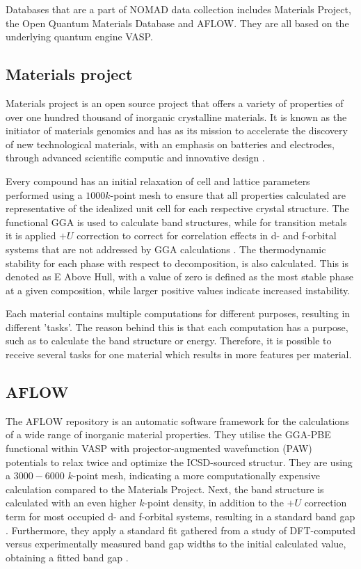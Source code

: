Databases that are a part of NOMAD data collection includes Materials Project, the Open Quantum Materials Database and AFLOW. They are all based on the underlying quantum engine VASP.

\subsection{Materials project}

Materials project \cite{Jain2013} is an open source project that offers a variety of properties of over one hundred thousand of inorganic crystalline materials. It is known as the initiator of materials genomics and has as its mission to accelerate the discovery of new technological materials, with an emphasis on batteries and electrodes, through advanced scientific computic and innovative design .


Every compound has an initial relaxation of cell and lattice parameters performed using a $1000 k$-point mesh to ensure that all properties calculated are representative of the idealized unit cell for each respective crystal structure. The functional GGA is used to calculate band structures, while for transition metals it is applied $+U$ correction to correct for correlation effects in d- and f-orbital systems that are not addressed by GGA calculations \cite{Wang2006}. The thermodynamic stability for each phase with respect to decomposition, is also calculated. This is denoted as E Above Hull, with a value of zero is defined as the most stable phase at a given composition, while larger positive values indicate increased instability.

Each material contains multiple computations for different purposes, resulting in different 'tasks'. The reason behind this is that each computation has a purpose, such as to calculate the band structure or energy. Therefore, it is possible to receive several tasks for one material which results in more features per material.

\subsection{AFLOW}

The AFLOW\cite{Curtarolo2012, Curtarolo2012a, Calderon2015} repository is an automatic software framework for the calculations of a wide range of inorganic material properties. They utilise the GGA-PBE functional within VASP with projector-augmented wavefunction (PAW) potentials to relax twice and optimize the ICSD-sourced structur. They are using a $3000-6000$ $k$-point mesh, indicating a more computationally expensive calculation compared to the Materials Project. Next, the band structure is calculated with an even higher $k$-point density, in addition to the $+U$ correction term for most occupied d- and f-orbital systems, resulting in a standard band gap \cite{Setyawan2010}. Furthermore, they apply a standard fit gathered from a study of DFT-computed versus experimentally measured band gap widths to the initial calculated value, obtaining a fitted band gap \cite{Setyawan2011}.

